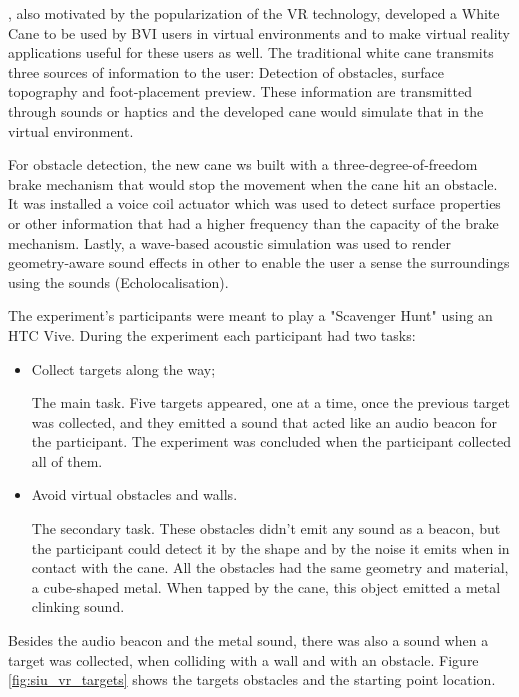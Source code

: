 \citeauthor{siu2020virtual}, also motivated by the popularization of the VR technology, developed a White Cane to be used by BVI users in virtual environments and to make virtual reality applications useful for these users as well. The traditional white cane transmits three sources of information to the user: Detection of obstacles, surface topography and foot-placement preview. These information are transmitted through sounds or haptics \cite{siu2020virtual} and the developed cane would simulate that in the virtual environment.

For obstacle detection, the new cane ws built with a three-degree-of-freedom brake mechanism that would stop the movement when the cane hit an obstacle. It was installed a voice coil actuator which was used to detect surface properties or other information that had a higher frequency than the capacity of the brake mechanism. Lastly, a wave-based acoustic simulation was used to render geometry-aware sound effects in other to enable the user a sense the surroundings using the sounds (Echolocalisation).

The experiment's participants were meant to play a "Scavenger Hunt" using an HTC Vive. During the experiment each participant had two tasks:

\begin{itemize}
    \item Collect targets along the way;
    
    The main task. Five targets appeared, one at a time, once the previous target was collected, and they emitted a sound that acted like an audio beacon for the participant. The experiment was concluded when the participant collected all of them.
    
    \item Avoid virtual obstacles and walls.
    
    The secondary task. These obstacles didn't emit any sound as a beacon, but the participant could detect it by the shape and by the noise it emits when in contact with the cane. All the obstacles had the same geometry and material, a cube-shaped metal. When tapped by the cane, this object emitted a metal clinking sound.
\end{itemize}

Besides the audio beacon and the metal sound, there was also a sound when a target was collected, when colliding with a wall and with an obstacle. Figure \ref{fig:siu_vr_targets} shows the targets obstacles and the starting point location.

